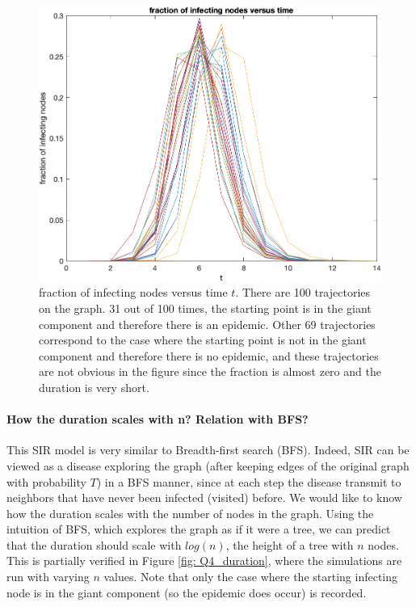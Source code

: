 \documentclass{article}
\begin{document}
 \begin{figure}[htp]
 	\centering
 	\includegraphics[width=.8\linewidth]{figs/Q4_fractionTime}
 	\caption{fraction of infecting nodes versus time $ t $. There are 100 trajectories on the graph. 31 out of 100 times, the starting point is in the giant component and therefore there is an epidemic.  Other 69 trajectories correspond to the case where the starting point is not in the giant component and therefore there is no epidemic, and these trajectories are not obvious in the figure since the fraction is almost zero and the duration is very short.  }
 	\label{fig: Q4_fractionTime}
 \end{figure}
 
\paragraph{How the duration scales with n? Relation with BFS?} 
This SIR model is very similar to Breadth-first search (BFS). Indeed, SIR can be viewed as a disease exploring the graph (after keeping edges of the original graph with probability $ T $) in a BFS manner, since at each step the disease transmit to neighbors that have never been infected (visited) before.
We would like to know how the duration scales with the number of nodes in the graph. Using the intuition of BFS, which explores the graph as if it were a tree, we can predict that the duration should scale with $ log(n) $, the height of a tree with $ n $ nodes. This is partially verified in Figure \ref{fig: Q4_duration}, where the simulations are run with varying $ n $ values. Note that only the case where the starting infecting node is in the giant component (so the epidemic does occur) is recorded.
\end{document}
